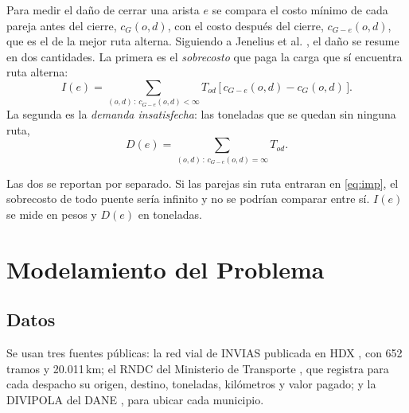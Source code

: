 \documentclass[conference]{IEEEtran}
\begin{document}
Para medir el daño de cerrar una arista $e$ se compara el costo mínimo de cada
pareja antes del cierre, $c_G(o,d)$, con el costo después del cierre,
$c_{G-e}(o,d)$, que es el de la mejor ruta alterna. Siguiendo a Jenelius et al.
\cite{jenelius2006}, el daño se resume en dos cantidades. La primera es el
\emph{sobrecosto} que paga la carga que sí encuentra ruta alterna:
\begin{equation}\label{eq:imp}
I(e)=\sum_{(o,d)\,:\,c_{G-e}(o,d)<\infty} T_{od}\,
\big[\,c_{G-e}(o,d)-c_G(o,d)\,\big].
\end{equation}
La segunda es la \emph{demanda insatisfecha}: las toneladas que se quedan sin
ninguna ruta,
\begin{equation}\label{eq:dem}
D(e)=\sum_{(o,d)\,:\,c_{G-e}(o,d)=\infty} T_{od} .
\end{equation}

Las dos se reportan por separado. Si las parejas sin ruta entraran en
\eqref{eq:imp}, el sobrecosto de todo puente sería infinito y no se podrían
comparar entre sí. $I(e)$ se mide en pesos y $D(e)$ en toneladas.


\section{Modelamiento del Problema}
\label{sec:modelo}

\subsection{Datos}
Se usan tres fuentes públicas: la red vial de INVIAS publicada en HDX
\cite{ocha_hdx_roads}, con 652 tramos y 20.011\,km; el RNDC del Ministerio de
Transporte \cite{rndc}, que registra para cada despacho su origen, destino,
toneladas, kilómetros y valor pagado; y la DIVIPOLA del DANE
\cite{dane_divipola}, para ubicar cada municipio.
\end{document}
